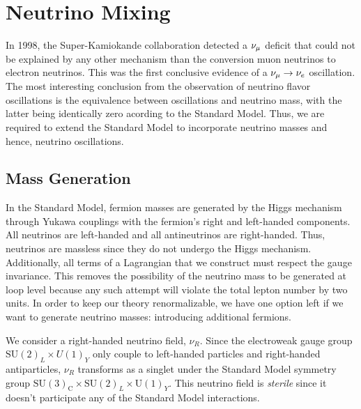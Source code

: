 % 
% 

\section{Neutrino Mixing}\label{ch:oscillation}
In 1998, the Super-Kamiokande collaboration detected a $\nu_\mu$ deficit that could not be explained by any other mechanism
than the conversion muon neutrinos to electron neutrinos. This was the first conclusive evidence of a $\nu_\mu \to \nu_e$ oscillation.
The most interesting conclusion from the observation of neutrino flavor oscillations is the equivalence between oscillations and neutrino mass, 
with the latter being identically zero acording to the Standard Model. Thus, we are required to extend the Standard Model to incorporate neutrino 
masses and hence, neutrino oscillations.

\subsection{Mass Generation}
In the Standard Model, fermion masses are generated by the Higgs mechanism through Yukawa couplings with the fermion's right and left-handed components.
All neutrinos are left-handed and all antineutrinos are right-handed. Thus, neutrinos are massless since they do not undergo the Higgs mechanism.
Additionally, all terms of a Lagrangian that we construct must respect the gauge invariance. This removes the possibility of the neutrino mass to be 
generated at loop level because any such attempt will violate the total lepton number by two units.
In order to keep our theory renormalizable, we have one option left if we want to generate neutrino masses: introducing additional fermions. 

We consider a right-handed neutrino field, $\nu_R$. Since the electroweak gauge group $\text{SU}(2)_L \times U(1)_Y$ only couple to 
left-handed particles and right-handed antiparticles, $\nu_R$ transforms as a singlet under the Standard Model symmetry 
group $\mathrm{SU}(3)_{\mathrm{C}} \times \mathrm{SU}(2)_{L} \times \mathrm{U}(1)_{Y}$. 
This neutrino field is \emph{sterile} since it doesn't participate any of the Standard Model interactions. 

